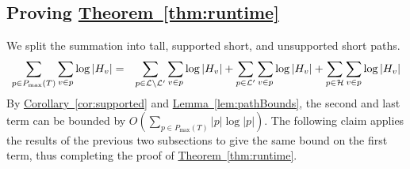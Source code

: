 \documentclass[11pt]{article}
\newtheorem{claim}[theorem]{Claim}
\theoremstyle{definition}
\newcommand{\cH}{{\cal H}}
\newcommand{\cL}{{\cal L}}
\newcommand{\Thm}[1]{\hyperref[thm:#1]{Theorem~\ref*{thm:#1}}} %
\newcommand{\Lem}[1]{\hyperref[lem:#1]{Lemma~\ref*{lem:#1}}} %
\newcommand{\Cor}[1]{\hyperref[cor:#1]{Corollary~\ref*{cor:#1}}} %
\newcommand{\pmax}{P_{\max}}
\begin{document}
\subsection{Proving \Thm{runtime}} \label{sec:thm-runtime}

We split the summation into tall, supported short, and unsupported short paths.
\begin{eqnarray*} 
\sum_{p \in \pmax(T)} \sum_{v \in p} \log |H_v| & = & \sum_{p \in \cL \setminus \cL'} \sum_{v \in p} \log |H_v| + \sum_{p \in \cL'} \sum_{v \in p} \log |H_v| + \sum_{p \in \cH} \sum_{v \in p} \log |H_v|
\end{eqnarray*}
By \Cor{supported} and \Lem{pathBounds}, the second and last term can be bounded by $O(\sum_{p \in \pmax(T)} |p|\log |p|)$.
The following claim applies the results of the previous two subsections to give the same bound on the first term, 
thus completing the proof of \Thm{runtime}.

% 
% 
% 
\end{document}
